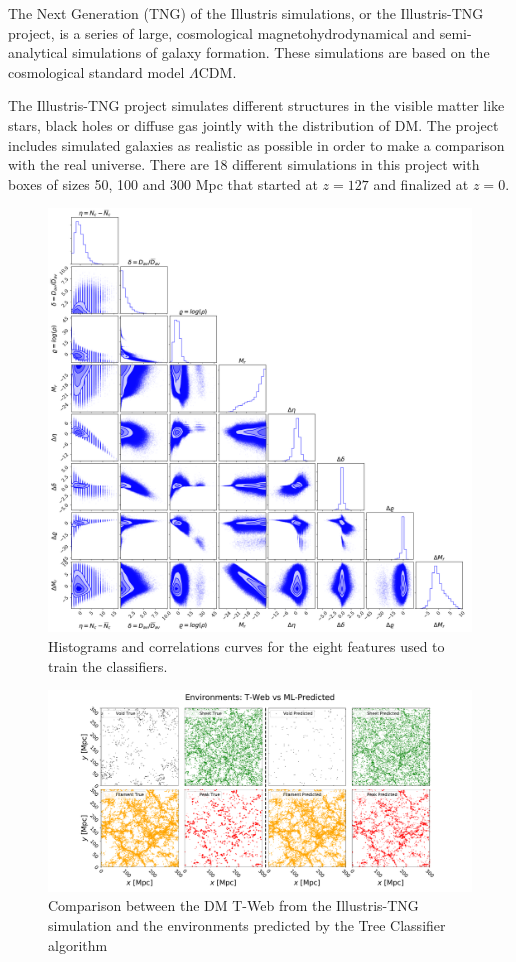 \documentclass[usenatbib]{mnras}
\begin{document}
The Next Generation (TNG) of the Illustris simulations, or the Illustris-TNG project, 
is a series of large, cosmological magnetohydrodynamical and semi-analytical simulations of
galaxy formation. These simulations are based on the cosmological standard model $\Lambda$CDM.

The Illustris-TNG project simulates different structures in the visible matter like stars, black
holes or diffuse gas jointly with the distribution of DM. 
The project includes simulated galaxies as realistic as possible in order to make a comparison
with the real universe.
There are 18 different simulations in this project with boxes of sizes 50, 100 and 300 Mpc
that started at  $z=127$ and finalized at $z=0$. 

\begin{figure}
        \includegraphics[scale=0.4]{Figs/p_all_features_correlations.pdf}
    \caption{Histograms and correlations curves for the eight features used to train the classifiers.}
    \label{fig:features}
\end{figure}

\begin{figure}
  \centering 
    \includegraphics[scale=0.33]{Figs/Fig2.pdf}
    \caption{Comparison between the DM T-Web from the Illustris-TNG simulation and the environments predicted by the Tree Classifier algorithm}
    \label{fig:prediction}
\end{figure}
\end{document}
